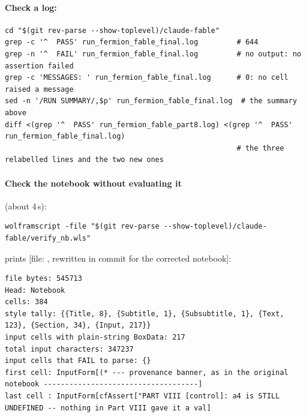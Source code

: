 \paragraph{Check a log:}
\begin{Verbatim}
cd "$(git rev-parse --show-toplevel)/claude-fable"
grep -c '^  PASS' run_fermion_fable_final.log         # 644
grep -n '^  FAIL' run_fermion_fable_final.log         # no output: no assertion failed
grep -c 'MESSAGES: ' run_fermion_fable_final.log      # 0: no cell raised a message
sed -n '/RUN SUMMARY/,$p' run_fermion_fable_final.log  # the summary above
diff <(grep '^  PASS' run_fermion_fable_part8.log) <(grep '^  PASS' run_fermion_fable_final.log)
                                                      # the three relabelled lines and the two new ones
\end{Verbatim}

\paragraph{Check the notebook without evaluating it} (about 4\,s):
\begin{Verbatim}[fontsize=\scriptsize]
wolframscript -file "$(git rev-parse --show-toplevel)/claude-fable/verify_nb.wls"
\end{Verbatim}
prints [file: , rewritten in commit  for the corrected
notebook]:
\begin{Verbatim}[fontsize=\scriptsize]
file bytes: 545713
Head: Notebook
cells: 384
style tally: {{Title, 8}, {Subtitle, 1}, {Subsubtitle, 1}, {Text, 123}, {Section, 34}, {Input, 217}}
input cells with plain-string BoxData: 217
total input characters: 347237
input cells that FAIL to parse: {}
first cell: InputForm[(* --- provenance banner, as in the original notebook ------------------------------------]
last cell : InputForm[cfAssert["PART VIII [control]: a4 is STILL UNDEFINED -- nothing in Part VIII gave it a val]
\end{Verbatim}

